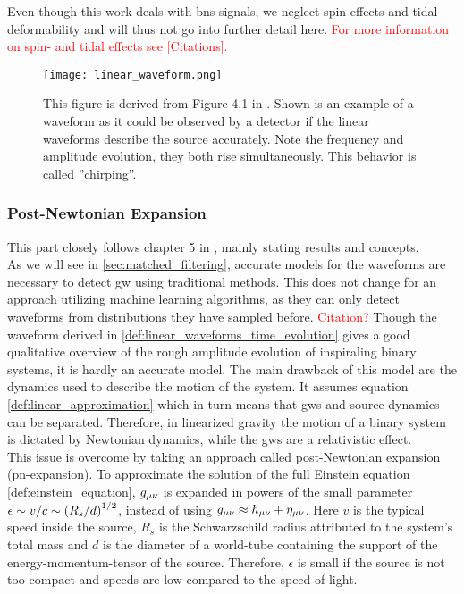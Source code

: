 Even though this work deals with \gls{bns}-signals, we neglect spin effects and tidal deformability and will thus not go into further detail here. \textcolor{red}{For more information on spin- and tidal effects see [Citations].}\\
\begin{figure}
\centering
\texttt{[image: linear\_waveform.png]}
\caption[Example time-evolution of a linear waveform]{This figure is derived from Figure 4.1 in \cite{gwv1}. Shown is an example of a waveform as it could be observed by a detector if the linear waveforms describe the source accurately. Note the frequency and amplitude evolution, they both rise simultaneously. This behavior is called ''chirping''.}\label{fig:linear_waveform}
\end{figure}

\subsubsection{Post-Newtonian Expansion}\label{sec:pn_expansion}
This part closely follows chapter 5 in \cite{gwv1}, mainly stating results and concepts.\\
As we will see in \autoref{sec:matched_filtering}, accurate models for the waveforms are necessary to detect \gls{gw} using traditional methods. This does not change for an approach utilizing machine learning algorithms, as they can only detect waveforms from distributions they have sampled before. \textcolor{red}{Citation?} Though the waveform derived in \eqref{def:linear_waveforms_time_evolution} gives a good qualitative overview of the rough amplitude evolution of inspiraling binary systems, it is hardly an accurate model. The main drawback of this model are the dynamics used to describe the motion of the system. It assumes equation \eqref{def:linear_approximation} which in turn means that \gls{gws} and source-dynamics can be separated. Therefore, in linearized gravity the motion of a binary system is dictated by Newtonian dynamics, while the \gls{gws} are a relativistic effect.\\
This issue is overcome by taking an approach called post-Newtonian expansion (\gls{pn}-expansion). To approximate the solution of the full Einstein equation \eqref{def:einstein_equation}, $g_{\mu\nu}$ is expanded in powers of the small parameter $\epsilon\sim v/c \sim {\left( R_s / d \right)}^{1/2}$, instead of using $g_{\mu\nu}\approx h_{\mu\nu} +\eta_{\mu\nu}$. Here $v$ is the typical speed inside the source, $R_s$ is the Schwarzschild radius attributed to the system's total mass and $d$ is the diameter of a world-tube containing the support of the energy-momentum-tensor of the source. Therefore, $\epsilon$ is small if the source is not too compact and speeds are low compared to the speed of light.\\
